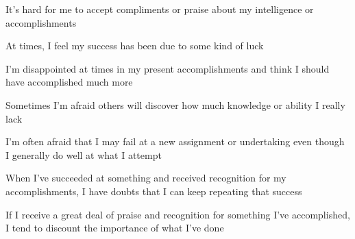\documentclass[aspectratio=169]{beamer}
\begin{document}
\begin{frame}
  \begin{center}
    \Huge    It’s  hard  for  me  to  accept  compliments  or  praise  about  my  intelligence  or  accomplishments
  \end{center}
\end{frame}

\begin{frame}
  \begin{center}
    \Huge At times, I feel my success has been due to some kind of luck
  \end{center}
\end{frame}

\begin{frame}
  \begin{center}
    \Huge   I’m  disappointed  at  times  in  my  present  accomplishments  and  think  I should have accomplished much more
\end{center}
\end{frame}

\begin{frame}
  \begin{center}
    \Huge   Sometimes I’m afraid others will discover how much knowledge or ability I really lack
  \end{center}
\end{frame}

\begin{frame}
  \begin{center}
    \Huge     I’m  often  afraid  that  I  may  fail  at  a  new  assignment  or  undertaking  even  though  I  generally  do  well  at  what  I
  attempt
\end{center}
\end{frame}

\begin{frame}
  \begin{center}
    \Huge   When  I’ve  succeeded  at  something  and  received  recognition  for  my  accomplishments,  I  have  doubts  that I can keep repeating that success
\end{center}
\end{frame}

\begin{frame}
  \begin{center}
    \Huge     If  I  receive  a  great  deal  of  praise  and  recognition  for  something  I’ve  accomplished,  I  tend  to  discount  the  importance
  of  what  I’ve  done
\end{center}
\end{frame}
\end{document}
